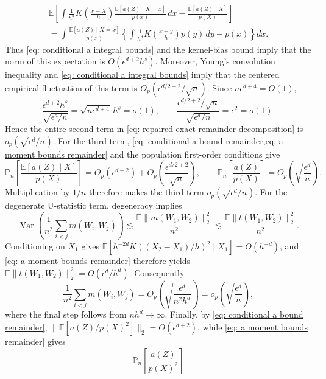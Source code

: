 \documentclass[11pt]{article}
\begin{document}
\begin{appendices}
\begin{multline*}
    \mathbb{E}\left[
        \int
        \frac{1}{h^d}
        K\left(\frac{x-X}{h}\right)
        \frac{\mathbb{E}[a(Z)\mid X=x]}{p(x)}
        \,dx
        -
        \frac{\mathbb{E}[a(Z)\mid X]}{p(X)}
    \right] \\
     =
    \int
    \frac{\mathbb{E}[a(Z)\mid X=x]}{p(x)}
    \left\{
        \int
        \frac{1}{h^d}
        K\left(\frac{x-y}{h}\right)p(y)\,dy-p(x)
    \right\}dx.
\end{multline*}
Thus \cref{eq: conditional a integral bounds} and the kernel-bias bound imply that the norm of this expectation is $O(\epsilon^{d+2}h^s)$. Moreover, Young's convolution inequality \citep[Theorem 1.2.12]{grafakos2014classical} and \cref{eq: conditional a integral bounds} imply that the centered empirical fluctuation of this term is
$O_p(\epsilon^{d/2+2}/\sqrt n)$. Since $n\epsilon^{d+4}=O(1)$,
\[
    \frac{\epsilon^{d+2}h^s}{\sqrt{\epsilon^d/n}}
    =
    \sqrt{n\epsilon^{d+4}}\,h^s=o(1),
    \qquad
    \frac{\epsilon^{d/2+2}/\sqrt n}{\sqrt{\epsilon^d/n}}
    =
    \epsilon^2=o(1).
\]
Hence the entire second term in \cref{eq: repaired exact remainder decomposition} is $o_p(\sqrt{\epsilon^d/n})$. For the third term, \cref{eq: conditional a bound remainder,eq: a moment bounds remainder} and the population first-order conditions give
\[
    \mathbb{P}_n\left[
        \frac{\mathbb{E}[a(Z)\mid X]}{p(X)}
    \right]
    =
    O_p(\epsilon^{d+2})
    +
    O_p\left(\frac{\epsilon^{d/2+2}}{\sqrt n}\right),
    \qquad
    \mathbb{P}_n\left[\frac{a(Z)}{p(X)}\right]
    =
    O_p\left(\sqrt{\frac{\epsilon^d}{n}}\right).
\]
Multiplication by $1/n$ therefore makes the third term
$o_p(\sqrt{\epsilon^d/n})$. For the degenerate U-statistic term, degeneracy implies
\[
    \operatorname{Var}\left(
        \frac{1}{n^2}\sum_{i<j}m(W_i,W_j)
    \right)
    \lesssim
    \frac{\mathbb{E}\|m(W_1,W_2)\|_2^2}{n^2}
    \lesssim
    \frac{\mathbb{E}\|t(W_1,W_2)\|_2^2}{n^2}.
\]
Conditioning on $X_1$ gives
$\mathbb{E}[h^{-2d}K((X_2-X_1)/h)^2\mid X_1]=O(h^{-d})$, and
\cref{eq: a moment bounds remainder} therefore yields
$\mathbb{E}\|t(W_1,W_2)\|_2^2=O(\epsilon^d/h^d)$. Consequently
\[
    \frac{1}{n^2}\sum_{i<j}m(W_i,W_j)
    =
    O_p\left(\sqrt{\frac{\epsilon^d}{n^2h^d}}\right)
    =
    o_p\left(\sqrt{\frac{\epsilon^d}{n}}\right),
\]
where the final step follows from $nh^d\to\infty$. Finally, by \cref{eq: conditional a bound remainder},
$\|\mathbb{E}[a(Z)/p(X)^2]\|_2=O(\epsilon^{d+2})$, while
\cref{eq: a moment bounds remainder} gives
\[
    \mathbb{P}_n\left[\frac{a(Z)}{p(X)^2}\right]
\]
\end{appendices}
\end{document}

